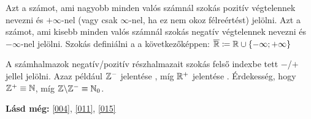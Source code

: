 \begin{note4}
Azt a számot, ami nagyobb minden valós számnál szokás pozitív végtelennek
nevezni és $+\infty$-nel (vagy csak $\infty$-nel, ha ez nem okoz félreértést)
jelölni. Azt a számot, ami kisebb minden valós számnál szokás negatív
végtelennek nevezni és $-\infty$-nel jelölni. Szokás definiálni a
 a következőképpen:
$\overline{\mathbb{R}} \coloneqq \mathbb{R} \cup \{-\infty; +\infty\}$
\end{note4}

\begin{note2}
A számhalmazok negatív/pozitív részhalmazait szokás felső indexbe tett $-$/$+$
jellel jelölni. Azaz például $\mathbb{Z}^-$ jelentése , míg $\mathbb{R}^+$ jelentése . Érdekesség, hogy $\mathbb{Z}^+ \equiv \mathbb{N}$,
míg $\mathbb{Z} \backslash \mathbb{Z}^- \equiv \mathbb{N}_0$.
\end{note2}

\textbf{Lásd még:} \ref{004}, \ref{011}, \ref{015}
